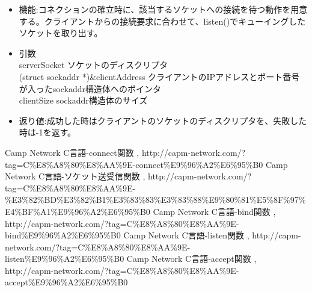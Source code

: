 \documentclass[a4j]{celb-report}
\begin{document}
\begin{enumerate}
\begin{lstlisting}[basicstyle=\ttfamily\footnotesize, frame=single]
  \end{lstlisting}
  \begin{itemize}
   \item 機能:コネクションの確立時に、該当するソケットへの接続を待つ動作を用意する。クライアントからの接続要求に合わせて、listen()でキューイングしたソケットを取り出す。
   \item 引数\\
serverSocket ソケットのディスクリプタ\\
(struct sockaddr *)\&clientAddress クライアントのIPアドレスとポート番号が入ったsockaddr構造体へのポインタ\\
clientSize sockaddr構造体のサイズ
   \item 返り値:成功した時はクライアントのソケットのディスクリプタを、失敗した時は-1を返す。
  \end{itemize}
\end{enumerate}
\newpage
\begin{thebibliography}{9}

 Camp Network C言語-connect関数 , http://capm-network.com/?tag=C\%E8\%A8\%80\%E8\%AA\%9E-connect\%E9\%96\%A2\%E6\%95\%B0
 Camp Network C言語-ソケット送受信関数 , http://capm-network.com/?tag=C\%E8\%A8\%80\%E8\%AA\%9E-\%E3\%82\%BD\%E3\%82\%B1\%E3\%83\%83\%E3\%83\%88\%E9\%80\%81\%E5\%8F\%97\%E4\%BF\%A1\%E9\%96\%A2\%E6\%95\%B0
 Camp Network C言語-bind関数 , http://capm-network.com/?tag=C\%E8\%A8\%80\%E8\%AA\%9E-bind\%E9\%96\%A2\%E6\%95\%B0
 Camp Network C言語-listen関数 , http://capm-network.com/?tag=C\%E8\%A8\%80\%E8\%AA\%9E-listen\%E9\%96\%A2\%E6\%95\%B0
 Camp Network C言語-accept関数 , http://capm-network.com/?tag=C\%E8\%A8\%80\%E8\%AA\%9E-accept\%E9\%96\%A2\%E6\%95\%B0
\end{thebibliography}
%
\end{document}

